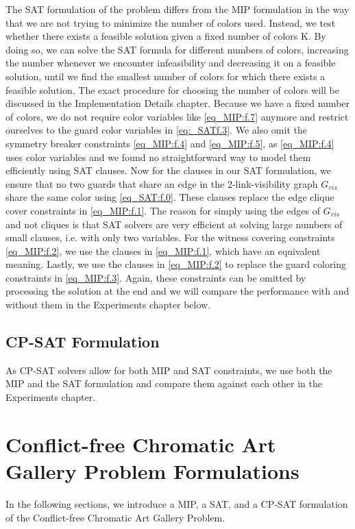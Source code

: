 The SAT formulation of the problem differs from the MIP formulation in the way that we are not trying to minimize the number of colors used. Instead, we test whether there exists a feasible solution given a fixed number of colors K. By doing so, we can solve the SAT formula for different numbers of colors, increasing the number whenever we encounter infeasibility and decreasing it on a feasible solution, until we find the smallest number of colors for which there exists a feasible solution. The exact procedure for choosing the number of colors will be discussed in the Implementation Details chapter. Because we have a fixed number of colors, we do not require color variables like \cref{eq_MIP:f.7} anymore and restrict ourselves to the guard color variables in \cref{eq:_SATf.3}. We also omit the symmetry breaker constraints \cref{eq_MIP:f.4} and \cref{eq_MIP:f.5}, as \cref{eq_MIP:f.4} uses color variables and we found no straightforward way to model them efficiently using SAT clauses. Now for the clauses in our SAT formulation, we ensure that no two guards that share an edge in the 2-link-visibility graph $G_{vis}$ share the same color using \cref{eq_SAT:f.0}. These clauses replace the edge clique cover constraints in \cref{eq_MIP:f.1}. The reason for simply using the edges of $G_{vis}$ and not cliques is that SAT solvers are very efficient at solving large numbers of small clauses, i.e. with only two variables. For the witness covering constraints \cref{eq_MIP:f.2}, we use the clauses in \cref{eq_MIP:f.1}, which have an equivalent meaning. Lastly, we use the clauses in \cref{eq_MIP:f.2} to replace the guard coloring constraints in \cref{eq_MIP:f.3}. Again, these constraints can be omitted by processing the solution at the end and we will compare the performance with and without them in the Experiments chapter below.

\section{CP-SAT Formulation}

As CP-SAT solvers allow for both MIP and SAT constraints, we use both the MIP and the SAT formulation and compare them against each other in the Experiments chapter.

\chapter{Conflict-free Chromatic Art Gallery Problem Formulations}

In the following sections, we introduce a MIP, a SAT, and a CP-SAT formulation of the Conflict-free Chromatic Art Gallery Problem.

